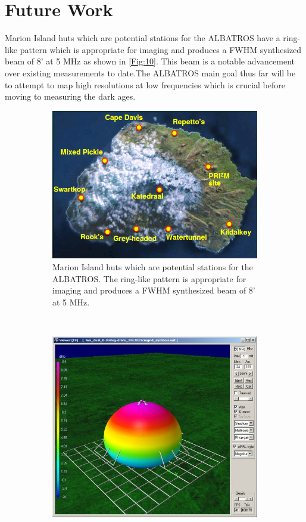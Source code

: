 \documentclass{ws-jai}
\begin{document}
\section{Future Work}

Marion Island huts which are potential stations for the ALBATROS have a ring-like pattern which is appropriate for imaging and produces a FWHM synthesized beam of 8' at 5 MHz as shown in \autoref{Fig:10}. This beam is a notable advancement over existing measurements to date.The ALBATROS main goal thus far will be to attempt to map high resolutions at low frequencies which is crucial before moving to measuring the dark ages.


\begin{figure}[h]
	\centering
	\begin{subfigure}[t]{0.5\textwidth}
		\centering
		\includegraphics[width=.9\linewidth]{Figures/site.PNG}
		\caption{Marion Island huts which are potential stations for the ALBATROS. The ring-like pattern is appropriate for imaging and produces a FWHM synthesized beam of 8' at 5 MHz.}
		\label{Fig:Marion}
	\end{subfigure}%
	~~~			
	\begin{subfigure}[t]{0.5\textwidth}
		\centering
		\includegraphics[width=.9\linewidth]{Figures/beam.png}

\end{subfigure}
\end{figure}
\end{document}
